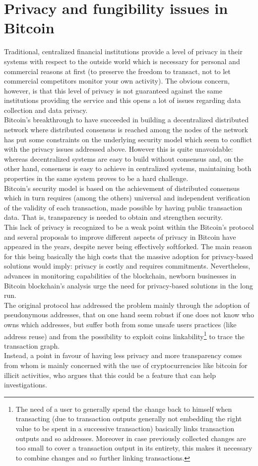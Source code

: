 \chapter{Privacy and fungibility issues in Bitcoin}
\label{chpr:priv_fung}
Traditional, centralized financial institutions provide a level of privacy in their systems with respect to the outside world which is necessary for personal and commercial reasons at first (to preserve the freedom to transact, not to let commercial competitors monitor your own activity). The obvious concern, however, is that this level of privacy is not guaranteed against the same institutions providing the service and this opens a lot of issues regarding data collection and data privacy. \\
Bitcoin's breakthrough to have succeeded in building a decentralized distributed network where distributed consensus is reached among the nodes of the network has put some constraints on the underlying security model which seem to conflict with the privacy issues addressed above. However this is quite unavoidable: whereas decentralized systems are easy to build without consensus and, on the other hand, consensus is easy to achieve in centralized systems, maintaining both properties in the same system proves to be a hard challenge.\\ 
Bitcoin's security model is based on the achievement of distributed consensus which in turn requires (among the others) universal and independent verification of the validity of each transaction, made possible by having public transaction data. That is, transparency is needed to obtain and strengthen security.\\
This lack of privacy is recognized to be a weak point within the Bitcoin's protocol and several proposals to improve different aspects of privacy in Bitcoin have appeared in the years, despite never being effectively softforked. The main reason for this being basically the high costs that the massive adoption for privacy-based solutions would imply: privacy is costly and requires commitments. Nevertheless, advances in monitoring capabilities of the blockchain, newborn businesses in Bitcoin blockchain's analysis urge the need for privacy-based solutions in the long run.\\
The original protocol has addressed the problem mainly through the adoption of pseudonymous addresses, that on one hand seem robust if one does not know who owns which addresses, but suffer both from some unsafe users practices (like address reuse) and from the possibility to exploit coins linkability\footnote{The need of a user to generally spend the change back to himself when transacting (due to transaction outputs generally not embedding the right value to be spent in a successive transaction) basically links transaction outputs and so addresses. Moreover in case previously collected changes are too small to cover a transaction output in its entirety, this makes it necessary to combine changes and so further linking transactions.} to trace the transaction graph.\\
Instead, a point in favour of having less privacy and more transparency comes from whom is mainly concerned with the use of cryptocurrencies like bitcoin for illicit activities, who argues that this could be a feature that can help investigations.
